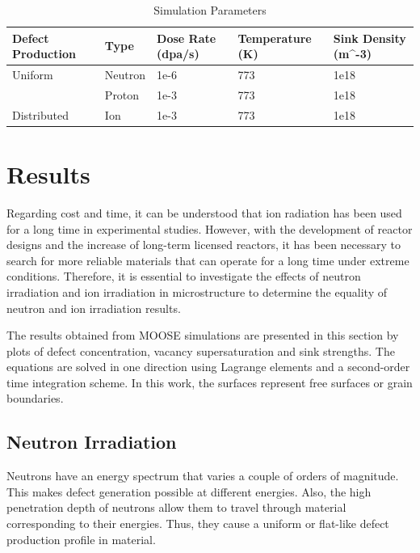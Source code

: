 \documentclass[a4paper]{article}
\begin{document}
\begin{table}[h!]
  \centering
  \caption{Simulation Parameters}
  \label{table:simulation_parameters}
  \begin{tabular}{ ||p{3cm}|p{2cm}|p{3cm}|p{3cm}|p{3cm}||  }
     \hline
     Defect Production & Type & Dose Rate (dpa/s) & Temperature (K) & Sink Density (m^{-3})\\
     \hline
     \hline
     Uniform     & Neutron  & 1e-6  & 773 & 1e18\\
                 & Proton   & 1e-3  & 773 & 1e18\\
     \hline
     Distributed & Ion      & 1e-3  & 773 & 1e18\\
     \hline
  \end{tabular}
\end{table}

\newpage
\section{Results} \hspace{10pt}

Regarding cost and time, it can be understood that ion radiation has been used for a long time in experimental studies. However, with the development of reactor designs and the increase of long-term licensed reactors, it has been necessary to search for more reliable materials that can operate for a long time under extreme conditions. Therefore, it is essential to investigate the effects of neutron irradiation and ion irradiation in microstructure to determine the equality of neutron and ion irradiation results.

The results obtained from MOOSE simulations are presented in this section by plots of defect concentration, vacancy supersaturation and sink strengths. The equations are solved in one direction using Lagrange elements and a second-order time integration scheme. In this work, the surfaces represent free surfaces or grain boundaries.  %


  \subsection{Neutron Irradiation} \hspace{10pt}
  Neutrons have an energy spectrum that varies a couple of orders of magnitude. This makes defect generation possible at different energies. Also, the high penetration depth of neutrons allow them to travel through material corresponding to their energies. Thus, they cause a uniform or flat-like defect production profile in material.\cite{was2016}
\end{document}
